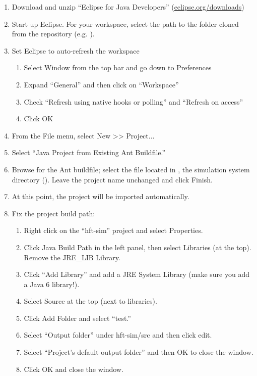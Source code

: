 \documentclass[11pt]{article}
\begin{document}
\begin{enumerate}
\item Download and unzip ``Eclipse for Java Developers'' (\href{http://www.eclipse.org/downloads/}{eclipse.org/downloads})
\item Start up Eclipse. For your workspace, select the path to
  the  folder cloned from the repository (e.g. ).
\item Set Eclipse to auto-refresh the workspace
  \begin{enumerate}
  \item Select Window from the top bar and go down to Preferences
  \item Expand ``General'' and then click on ``Workspace''
  \item Check ``Refresh using native hooks or polling'' and ``Refresh on access''
  \item Click OK
  \end{enumerate}
  
\item From the File menu, select New >> Project...
\item Select ``Java Project from Existing Ant Buildfile.''
\item Browse for the Ant buildfile; select the  file located in , the simulation system directory
  (). Leave the project name unchanged and
  click Finish.
\item At this point, the project will be imported automatically.
\item Fix the project build path:
  \begin{enumerate}
  \item Right click on the ``hft-sim'' project and select Properties.
  \item Click Java Build Path in the left panel, then select Libraries (at the
    top). Remove the JRE\_LIB Library.
  \item Click ``Add Library'' and add a JRE System Library (make sure you add a Java 6 library!).
  \item Select Source at the top (next to libraries).
  \item Click Add Folder and select ``test.''
  \item Select ``Output folder'' under hft-sim/src and then click edit.
  \item Select ``Project's default output folder'' and then OK to close the window.
  \item Click OK and close the window.
  \end{enumerate}


\end{enumerate}
\end{document}
